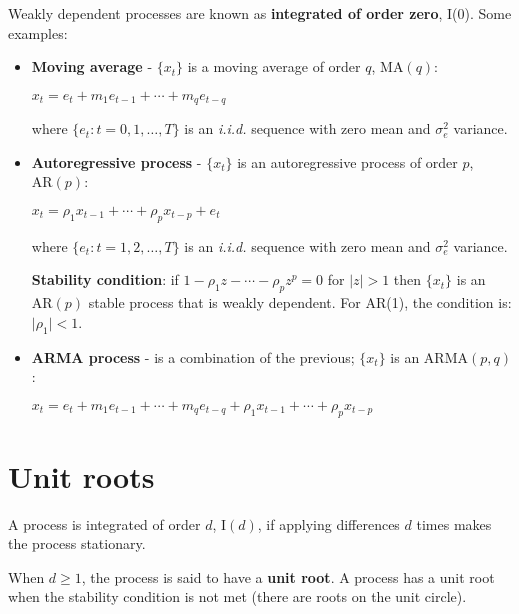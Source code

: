 \documentclass[10pt, a4paper, landscape]{article}
\begin{document}
\begin{multicols}{3}
Weakly dependent processes are known as \textbf{integrated of order zero}, I(0). Some examples:

\begin{itemize}[leftmargin=*]
	\item \textbf{Moving average} - \( \{ x_{t} \} \) is a moving average of order \( q \), \( \text{MA}(q) \):
	\begin{center}
		\( x_{t} = e_{t} + m_{1} e_{t - 1} + \cdots + m_{q} e_{t - q} \)
	\end{center}
	where \( \{ e_{t} : t = 0, 1, \ldots, T \} \) is an \textsl{i.i.d.} sequence with zero mean and \( \sigma_{e}^{2} \) variance.
	\item \textbf{Autoregressive process} - \( \{ x_{t} \} \) is an autoregressive process of order \( p \), \( \text{AR}(p) \):
	\begin{center}
		\( x_{t} = \rho_{1} x_{t - 1} + \cdots + \rho_{p} x_{t - p} + e_{t} \)
	\end{center}
	where \( \{ e_{t} : t = 1, 2, \ldots, T \} \) is an \textsl{i.i.d.} sequence with zero mean and \( \sigma_{e}^{2} \) variance.

	\textbf{Stability condition}: if \( 1 - \rho_{1} z - \cdots - \rho_{p} z^{p} = 0 \) for \( \lvert z \rvert > 1 \) then \( \{ x_{t} \} \) is an \( \text{AR}(p) \) stable process that is weakly dependent. For AR(1), the condition is: \( \lvert \rho_{1} \rvert < 1 \).

	\item \textbf{ARMA process} - is a combination of the previous; \( \{ x_{t} \} \) is an \( \text{ARMA}(p, q) \):
	\begin{center}
		\( x_{t} = e_{t} + m_{1} e_{t - 1} + \cdots + m_{q} e_{t - q} + \rho_{1} x_{t - 1} + \cdots + \rho_{p} x_{t - p} \)
	\end{center}
\end{itemize}

\columnbreak

\section*{Unit roots}

A process is integrated of order \( d \), \( \text{I}(d) \), if applying differences \( d \) times makes the process stationary.

When \( d \geq 1 \), the process is said to have a \textbf{unit root}. A process has a unit root when the stability condition is not met (there are roots on the unit circle).


\end{multicols}
\end{document}
